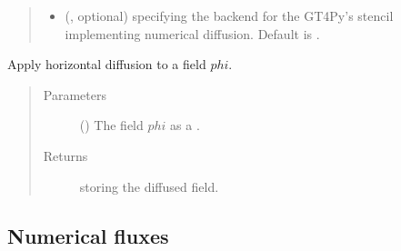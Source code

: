 \documentclass[letterpaper,10pt,english]{sphinxmanual}
\begin{document}
\begin{fulllineitems}
\begin{fulllineitems}
\begin{quote}
\begin{description}
\begin{itemize}
\item {} 
 (, optional) \textendash{}  specifying the backend for the GT4Py’s stencil
implementing numerical diffusion. Default is .

\end{itemize}

\end{description}\end{quote}

\end{fulllineitems}


\begin{fulllineitems}
\label{\detokenize{api:dycore.diffusion.Diffusion.apply}}
Apply horizontal diffusion to a field \(phi\).
\begin{quote}\begin{description}
\item[{Parameters}] \leavevmode
{} () \textendash{} The field \(phi\) as a .

\item[{Returns}] \leavevmode
{} storing the diffused field.

\end{description}\end{quote}

\end{fulllineitems}


\end{fulllineitems}



\subsection{Numerical fluxes}
\label{\detokenize{api:numerical-fluxes}}
\end{document}
